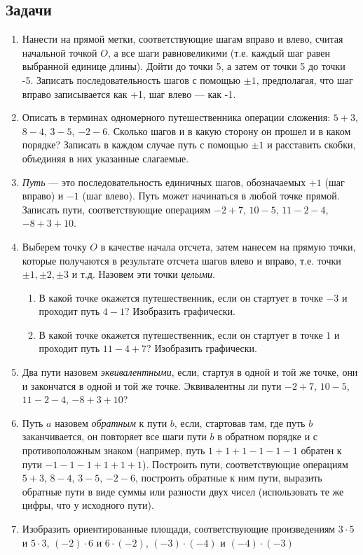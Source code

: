 \subsection*{Задачи}
\begin{enumerate}
\item Нанести на прямой метки, соответствующие шагам вправо и влево, считая начальной точкой $O$, а все шаги равновеликими (т.е. каждый шаг равен выбранной единице длины). Дойти до точки 5, а затем от точки 5 до точки -5. Записать последовательность шагов с помощью $\pm 1$, предполагая, что шаг вправо записывается как +1, шаг влево --- как -1.
\item Описать в терминах одномерного путешественника операции сложения: $5+3$, $8-4$, $3-5$, $-2-6$. Сколько шагов и в какую сторону он прошел и в каком порядке? Записать в каждом случае путь с помощью $\pm1$ и расставить скобки, объединяя в них указанные слагаемые.
\item \textit{Путь} --- это последовательность единичных шагов, обозначаемых $+1$ (шаг вправо) и $-1$ (шаг влево). Путь может начинаться в любой точке прямой.
Записать пути, соответствующие операциям $-2+7$, $10-5$, $11-2-4$, $-8+3+10$. 
\item Выберем точку $O$ в качестве начала отсчета, затем нанесем на прямую точки, которые получаются в результате отсчета шагов влево и вправо, т.е. точки $\pm1, \pm2, \pm3$ и т.д. Назовем эти точки \textit{целыми}.
\begin{enumerate}
\item В какой точке окажется путешественник, если он стартует в точке $-3$ и проходит путь $4-1$? Изобразить графически.
\item В какой точке окажется путешественник, если он стартует в точке $1$ и проходит путь $11-4+7$? Изобразить графически.
\end{enumerate}
\item Два пути назовем \textit{эквивалентными}, если, стартуя в одной и той же точке, они и закончатся в одной и той же точке. Эквивалентны ли пути $-2+7$, $10-5$, $11-2-4$, $-8+3+10$?
\item Путь $a$ назовем \textit{обратным} к пути $b$, если, стартовав там, где путь $b$ заканчивается, он повторяет все шаги пути $b$ в обратном порядке и с противоположным знаком (например, путь $1+1+1-1-1-1$ обратен к пути $-1-1-1+1+1+1$). Построить пути, соответствующие операциям $5+3$, $8-4$, $3-5$, $-2-6$, построить обратные к ним пути, выразить обратные пути в виде суммы или разности двух чисел (использовать те же цифры, что у исходного пути).
\item Изобразить ориентированные площади, соответствующие произведениям $3\cdot 5$ и $5\cdot 3$, $(-2)\cdot 6$ и $6\cdot (-2)$, $(-3)\cdot(-4)$ и $(-4)\cdot(-3)$
\end{enumerate}



